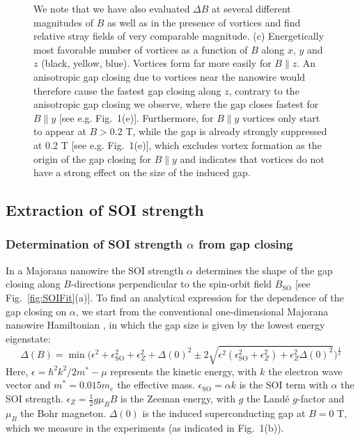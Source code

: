 \begin{figure}
{We note that we have also evaluated $\Delta B$ at several different magnitudes of $B$ as well as in the presence of vortices and find relative stray fields of very comparable magnitude.
(c) Energetically most favorable number of vortices as a function of $B$ along $x$, $y$ and $z$ (black, yellow, blue).
Vortices form far more easily for $B \parallel z$.
An anisotropic gap closing due to vortices near the nanowire would therefore cause the fastest gap closing along $z$, contrary to the anisotropic gap closing we observe, where the gap closes fastest for $B \parallel  y$ [see e.g.
Fig.~1(e)].
Furthermore, for $B \parallel y$ vortices only start to appear at $B > 0.2$ T, while the gap is already strongly suppressed at 0.2 T [see e.g.
Fig.~1(e)], which excludes vortex formation as the origin of the gap closing for $B \parallel y$ and indicates that vortices do not have a strong effect on the size of the induced gap.
}
\end{figure}

\subsection{Extraction of SOI strength}
\subsubsection{Determination of SOI strength $\alpha$ from gap closing}
In a Majorana nanowire the SOI strength $\alpha$ determines the shape of the gap closing along $B$-directions perpendicular to the spin-orbit field $B_{\mathrm{SO}}$ \cite{VanHeck,Pan2018} [see Fig.~\ref{fig:SOIFit}(a)].
To find an analytical expression for the dependence of the gap closing on $\alpha$, we start from the conventional one-dimensional Majorana nanowire Hamiltonian \cite{Lutchyn2010,Oreg2010}, in which the gap size is given by the lowest energy eigenstate:
\begin{equation}
\Delta(B) = \min \bigg( \epsilon^2 + \epsilon_{\mathrm{SO}}^2 + \epsilon_{Z}^2 + \Delta(0)^2 \pm 2 \sqrt{\epsilon^2 ( \epsilon_{\mathrm{SO}}^2+\epsilon_{Z}^2 ) + \epsilon_{Z}^2\Delta(0)^2} \bigg)^\frac{1}{2}
\end{equation}
Here, $\epsilon=\hbar^2k^2/2m^*-\mu$ represents the kinetic energy, with $k$ the electron wave vector and $m^*=0.015 m_e$ the effective mass.
$\epsilon_{\mathrm{SO}}=\alpha k$ is the SOI term with $\alpha$ the SOI strength.
$\epsilon_Z = \frac{1}{2}g\mu_BB$ is the Zeeman energy, with $g$ the Land\'e $g$-factor and $\mu_B$ the Bohr magneton.
$\Delta(0)$ is the induced superconducting gap at $B = 0$ T, which we measure in the experiments (as indicated in Fig.~1(b)).

